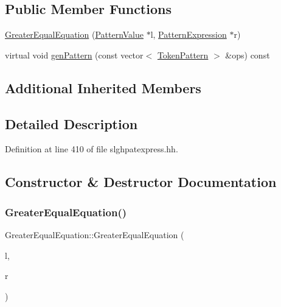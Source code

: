 \subsection*{Public Member Functions}
\begin{DoxyCompactItemize}
\item 
\mbox{\hyperlink{class_greater_equal_equation_a3f5c5eee923a2013213ab8be46c1aa49}{Greater\+Equal\+Equation}} (\mbox{\hyperlink{class_pattern_value}{Pattern\+Value}} $\ast$l, \mbox{\hyperlink{class_pattern_expression}{Pattern\+Expression}} $\ast$r)
\item 
virtual void \mbox{\hyperlink{class_greater_equal_equation_ac3b38fb035abd2547debc594396bf5f6}{gen\+Pattern}} (const vector$<$ \mbox{\hyperlink{class_token_pattern}{Token\+Pattern}} $>$ \&ops) const
\end{DoxyCompactItemize}
\subsection*{Additional Inherited Members}


\subsection{Detailed Description}


Definition at line 410 of file slghpatexpress.\+hh.



\subsection{Constructor \& Destructor Documentation}
\mbox{\label{class_greater_equal_equation_a3f5c5eee923a2013213ab8be46c1aa49}} 
\subsubsection{\texorpdfstring{GreaterEqualEquation()}{GreaterEqualEquation()}}
{\footnotesize\ttfamily Greater\+Equal\+Equation\+::\+Greater\+Equal\+Equation (\begin{DoxyParamCaption}\item[{\mbox{\hyperlink{class_pattern_value}{Pattern\+Value}} $\ast$}]{l,  }\item[{\mbox{\hyperlink{class_pattern_expression}{Pattern\+Expression}} $\ast$}]{r }\end{DoxyParamCaption})\hspace{0.3cm}{\ttfamily [inline]}}



